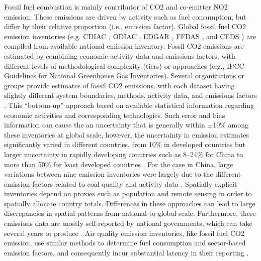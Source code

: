Fossil fuel combustion is mainly contributor of CO2 and co-emitter NO2 emission. These emissions are driven by activity such as fuel consumption, but differ by their relative proportion (i.e., emission factor)\citep{miyazaki2023predictability}. Global fossil fuel CO2 emission inventories (e.g.  CDIAC \citep{andres2012synthesis}, ODIAC \citep{oda2011very, oda2018open}, EDGAR \citep{crippa2020high}, FFDAS \citep{asefi2014multiyear}, and CEDS \citep{hoesly2018historical}) are compiled from available national emission inventory. Fossil CO2 emissions are estimated by combining economic activity data and emissions factors, with different levels of methodological complexity (tiers) or approaches (e.g., IPCC Guidelines for National Greenhouse Gas Inventories). Several organizations or groups provide estimates of fossil CO2 emissions, with each dataset having slightly different system boundaries, methods, activity data, and emissions factors \citep{andrew2020comparison}. This “bottom-up” approach based on available statistical information regarding economic activities and corresponding technologies. Such error and bias information can cause the an uncertainty that is generally within ±10\% among these inventories at global scale, however, the uncertainty in emission estimates significantly varied in different countries, from 10\% in developed countries\citep{essd-11-1783-2019} but larger uncertainty in rapidly developing countries such as 8–24\% for China \citep{han2020evaluating, marland2008uncertainties} to more than 50\% for least developed countries \citep{andres2016gridded, essd-11-1783-2019, oda2018open}. For the case in China, large variations between nine emission inventories were largely due to the different emission factors related to coal quality and activity data \citep{han2020evaluating,miyazaki2023predictability}. Spatially explicit inventories depend on proxies such as population and remote sensing in order to spatially allocate country totals. Differences in these approaches can lead to large discrepancies in spatial patterns from national to global scale. Furthermore, these emissions data are mostly self-reported by national governments, which can take several years to produce \citep{marland2008uncertainties}. Air quality emission inventories, like fossil fuel CO2 emission, use similar methods to determine fuel consumption and sector-based emission factors, and consequently incur substantial latency in their reporting \citep{miyazaki2023predictability}.\par

